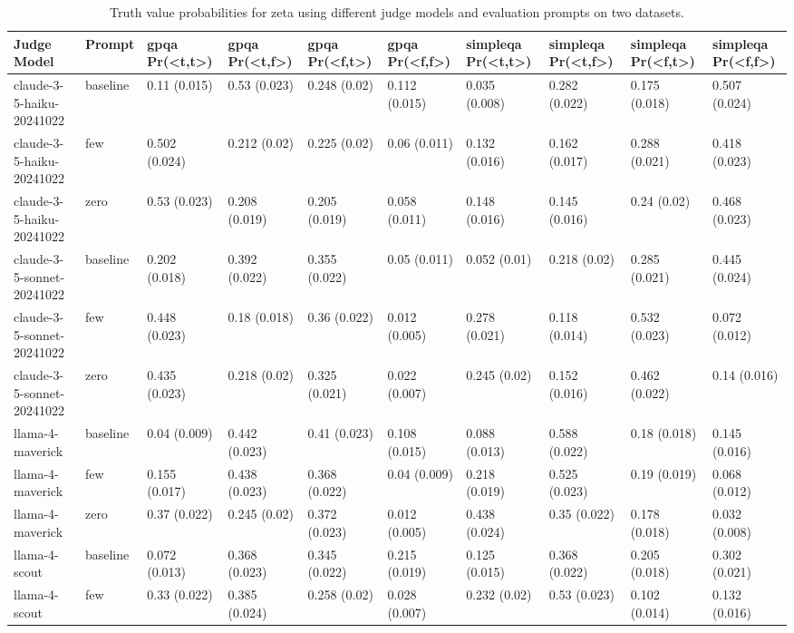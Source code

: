 \begin{table}[htbp]
\caption{Truth value probabilities for zeta using different judge models and evaluation prompts on two datasets.}
\label{tab:finaltv}
\begin{tabular}{llllllllll}
\toprule
Judge Model & Prompt & gpqa Pr(<t,t>) & gpqa Pr(<t,f>) & gpqa Pr(<f,t>) & gpqa Pr(<f,f>) & simpleqa Pr(<t,t>) & simpleqa Pr(<t,f>) & simpleqa Pr(<f,t>) & simpleqa Pr(<f,f>) \\
\midrule
claude-3-5-haiku-20241022 & baseline & 0.11 (0.015) & 0.53 (0.023) & 0.248 (0.02) & 0.112 (0.015) & 0.035 (0.008) & 0.282 (0.022) & 0.175 (0.018) & 0.507 (0.024) \\
claude-3-5-haiku-20241022 & few & 0.502 (0.024) & 0.212 (0.02) & 0.225 (0.02) & 0.06 (0.011) & 0.132 (0.016) & 0.162 (0.017) & 0.288 (0.021) & 0.418 (0.023) \\
claude-3-5-haiku-20241022 & zero & 0.53 (0.023) & 0.208 (0.019) & 0.205 (0.019) & 0.058 (0.011) & 0.148 (0.016) & 0.145 (0.016) & 0.24 (0.02) & 0.468 (0.023) \\
claude-3-5-sonnet-20241022 & baseline & 0.202 (0.018) & 0.392 (0.022) & 0.355 (0.022) & 0.05 (0.011) & 0.052 (0.01) & 0.218 (0.02) & 0.285 (0.021) & 0.445 (0.024) \\
claude-3-5-sonnet-20241022 & few & 0.448 (0.023) & 0.18 (0.018) & 0.36 (0.022) & 0.012 (0.005) & 0.278 (0.021) & 0.118 (0.014) & 0.532 (0.023) & 0.072 (0.012) \\
claude-3-5-sonnet-20241022 & zero & 0.435 (0.023) & 0.218 (0.02) & 0.325 (0.021) & 0.022 (0.007) & 0.245 (0.02) & 0.152 (0.016) & 0.462 (0.022) & 0.14 (0.016) \\
llama-4-maverick & baseline & 0.04 (0.009) & 0.442 (0.023) & 0.41 (0.023) & 0.108 (0.015) & 0.088 (0.013) & 0.588 (0.022) & 0.18 (0.018) & 0.145 (0.016) \\
llama-4-maverick & few & 0.155 (0.017) & 0.438 (0.023) & 0.368 (0.022) & 0.04 (0.009) & 0.218 (0.019) & 0.525 (0.023) & 0.19 (0.019) & 0.068 (0.012) \\
llama-4-maverick & zero & 0.37 (0.022) & 0.245 (0.02) & 0.372 (0.023) & 0.012 (0.005) & 0.438 (0.024) & 0.35 (0.022) & 0.178 (0.018) & 0.032 (0.008) \\
llama-4-scout & baseline & 0.072 (0.013) & 0.368 (0.023) & 0.345 (0.022) & 0.215 (0.019) & 0.125 (0.015) & 0.368 (0.022) & 0.205 (0.018) & 0.302 (0.021) \\
llama-4-scout & few & 0.33 (0.022) & 0.385 (0.024) & 0.258 (0.02) & 0.028 (0.007) & 0.232 (0.02) & 0.53 (0.023) & 0.102 (0.014) & 0.132 (0.016) \\

\end{tabular}
\end{table}
